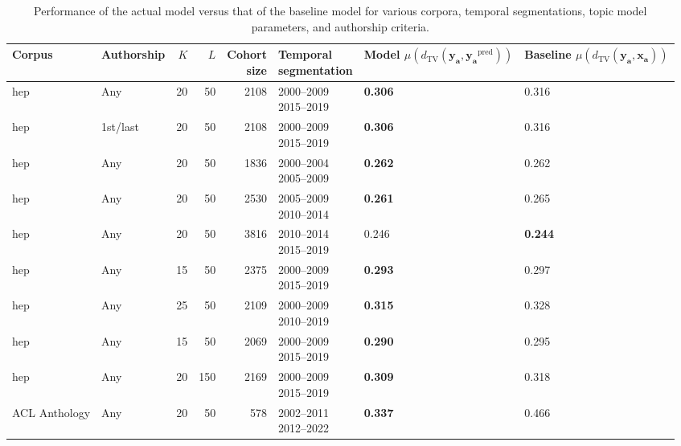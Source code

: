 \begin{table}
\caption{Performance of the actual model versus that of the baseline model for various corpora, temporal segmentations, topic model parameters, and authorship criteria.}
\label{table:performance}
\begin{tabular}{llrrrlll}
\toprule
Corpus & Authorship & $K$ & $L$ & \makecell{Cohort \\ size} & \makecell{Temporal \\ segmentation} & \makecell{Model \\ $\mu(d_{{\mathrm{{TV}}}}(\bm{{y_{{a}}}}, \bm{{y_{{a}}}}^{{\text{{pred}}}}))$} & \makecell{Baseline \\ $\mu(d_{{\mathrm{{TV}}}}(\bm{{y_{{a}}}}, \bm{{x_{{a}}}}))$} \\
\midrule
\gls{hep} & Any & 20 & 50 & 2108 & \makecell{2000--2009 \\ 2015--2019} & \textbf{0.306} & 0.316 \\
\gls{hep} & 1st/last & 20 & 50 & 2108 & \makecell{2000--2009 \\ 2015--2019} & \textbf{0.306} & 0.316 \\
\gls{hep} & Any & 20 & 50 & 1836 & \makecell{2000--2004 \\ 2005--2009} & \textbf{0.262} & 0.262 \\
\gls{hep} & Any & 20 & 50 & 2530 & \makecell{2005--2009 \\ 2010--2014} & \textbf{0.261} & 0.265 \\
\gls{hep} & Any & 20 & 50 & 3816 & \makecell{2010--2014 \\ 2015--2019} & 0.246 & \textbf{0.244} \\
\gls{hep} & Any & 15 & 50 & 2375 & \makecell{2000--2009 \\ 2015--2019} & \textbf{0.293} & 0.297 \\
\gls{hep} & Any & 25 & 50 & 2109 & \makecell{2000--2009 \\ 2010--2019} & \textbf{0.315} & 0.328 \\
\gls{hep} & Any & 15 & 50 & 2069 & \makecell{2000--2009 \\ 2015--2019} & \textbf{0.290} & 0.295 \\
\gls{hep} & Any & 20 & 150 & 2169 & \makecell{2000--2009 \\ 2015--2019} & \textbf{0.309} & 0.318 \\
ACL Anthology & Any & 20 & 50 & 578 & \makecell{2002--2011 \\ 2012--2022} & \textbf{0.337} & 0.466 \\
\bottomrule
\end{tabular}
\end{table}
